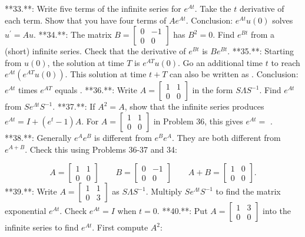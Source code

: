 

**33.**: Write five terms of the infinite series for \(e^{At}\). Take the \(t\) derivative of each term. Show that you have four terms of \(Ae^{At}\). Conclusion: \(e^{At}u(0)\) solves \(u^{\prime}=Au\).
**34.**: The matrix \(B=\left[\begin{smallmatrix}0&-1\\ 0&0\end{smallmatrix}\right]\) has \(B^{2}=0\). Find \(e^{Bt}\) from a (short) infinite series. Check that the derivative of \(e^{Bt}\) is \(Be^{Bt}\).
**35.**: Starting from \(u(0)\), the solution at time \(T\) is \(e^{AT}u(0)\). Go an additional time \(t\) to reach \(e^{At}(e^{AT}u(0))\). This solution at time \(t+T\) can also be written as . Conclusion: \(e^{At}\) times \(e^{AT}\) equals .
**36.**: Write \(A=\left[\begin{smallmatrix}1&1\\ 0&0\end{smallmatrix}\right]\) in the form \(S\Lambda S^{-1}\). Find \(e^{At}\) from \(Se^{\Lambda t}S^{-1}\).
**37.**: If \(A^{2}=A\), show that the infinite series produces \(e^{At}=I+(e^{t}-1)A\). For \(A=\left[\begin{smallmatrix}1&1\\ 0&0\end{smallmatrix}\right]\) in Problem 36, this gives \(e^{At}=\) .
**38.**: Generally \(e^{A}e^{B}\) is different from \(e^{B}e^{A}\). They are both different from \(e^{A+B}\). Check this using Problems 36-37 and 34:

\[A=\left[\begin{smallmatrix}1&1\\ 0&0\end{smallmatrix}\right]\qquad B=\left[\begin{smallmatrix}0&-1\\ 0&0\end{smallmatrix}\right]\qquad A+B=\left[\begin{smallmatrix}1&0\\ 0&0\end{smallmatrix}\right].\]
**39.**: Write \(A=\left[\begin{smallmatrix}1&1\\ 0&3\end{smallmatrix}\right]\) as \(S\Lambda S^{-1}\). Multiply \(Se^{\Lambda t}S^{-1}\) to find the matrix exponential \(e^{At}\). Check \(e^{At}=I\) when \(t=0\).
**40.**: Put \(A=\left[\begin{smallmatrix}1&3\\ 0&0\end{smallmatrix}\right]\) into the infinite series to find \(e^{At}\). First compute \(A^{2}\):

